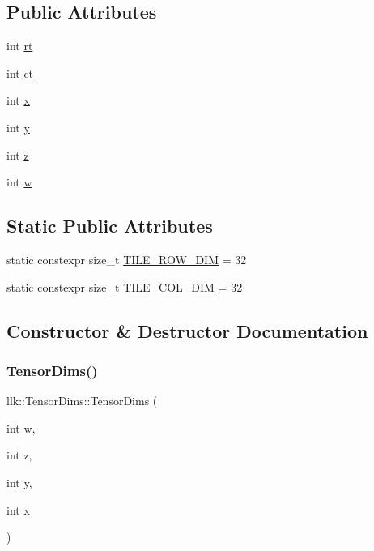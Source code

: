 \subsection*{Public Attributes}
\begin{DoxyCompactItemize}
\item 
int \hyperlink{structllk_1_1TensorDims_abed7f5a8a79ea929142ad1a2fba6752d}{rt}
\item 
int \hyperlink{structllk_1_1TensorDims_a61f71e8dcc5b6bba20cfc89b4f7e899c}{ct}
\item 
int \hyperlink{structllk_1_1TensorDims_a06e23d03e9701fb0cd42109c2c89e14f}{x}
\item 
int \hyperlink{structllk_1_1TensorDims_afabf2a6cb993733866a5127bd5c8054b}{y}
\item 
int \hyperlink{structllk_1_1TensorDims_a9c66eaf5cab067403864bfec44d10dc1}{z}
\item 
int \hyperlink{structllk_1_1TensorDims_aaf0debf1e0ce1dedcd4827b14404747e}{w}
\end{DoxyCompactItemize}
\subsection*{Static Public Attributes}
\begin{DoxyCompactItemize}
\item 
static constexpr size\+\_\+t \hyperlink{structllk_1_1TensorDims_ae4a0ec57dc566e3c3b3fe0a932a41b4f}{T\+I\+L\+E\+\_\+\+R\+O\+W\+\_\+\+D\+IM} = 32
\item 
static constexpr size\+\_\+t \hyperlink{structllk_1_1TensorDims_a812883e0fbbbb1e47630c2eae55ebd7d}{T\+I\+L\+E\+\_\+\+C\+O\+L\+\_\+\+D\+IM} = 32
\end{DoxyCompactItemize}


\subsection{Constructor \& Destructor Documentation}
\mbox{\label{structllk_1_1TensorDims_a5bc2a28dad2022e94da65c139a49af41}} 
\subsubsection{\texorpdfstring{Tensor\+Dims()}{TensorDims()}\hspace{0.1cm}{\footnotesize\ttfamily [1/3]}}
{\footnotesize\ttfamily llk\+::\+Tensor\+Dims\+::\+Tensor\+Dims (\begin{DoxyParamCaption}\item[{int}]{w,  }\item[{int}]{z,  }\item[{int}]{y,  }\item[{int}]{x }\end{DoxyParamCaption})\hspace{0.3cm}{\ttfamily [inline]}}

